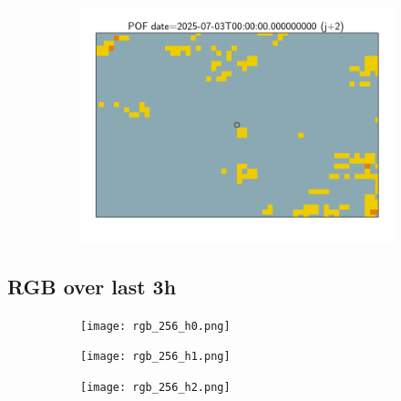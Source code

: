 \documentclass{article}
\begin{document}
\begin{figure}[H]
\begin{subfigure}[b]{0.31\textwidth}
    \end{subfigure}
    \begin{subfigure}[b]{0.36\textwidth}
        \centering
        \includegraphics[width=0.85\linewidth]{pof_256_j2.png} %
    \end{subfigure}
\end{figure}


\vspace{-1em}
\subsection*{RGB over last 3h}
\vspace{-1em}
\begin{figure}[H]
    \centering
    \begin{subfigure}[b]{0.32\textwidth}
        \centering
        \texttt{[image: rgb\_256\_h0.png]} %
    \end{subfigure}
    \begin{subfigure}[b]{0.32\textwidth}
        \centering
        \texttt{[image: rgb\_256\_h1.png]} %
    \end{subfigure}
    \begin{subfigure}[b]{0.32\textwidth}
        \centering
        \texttt{[image: rgb\_256\_h2.png]} %
    \end{subfigure}
\end{figure}
\end{document}
